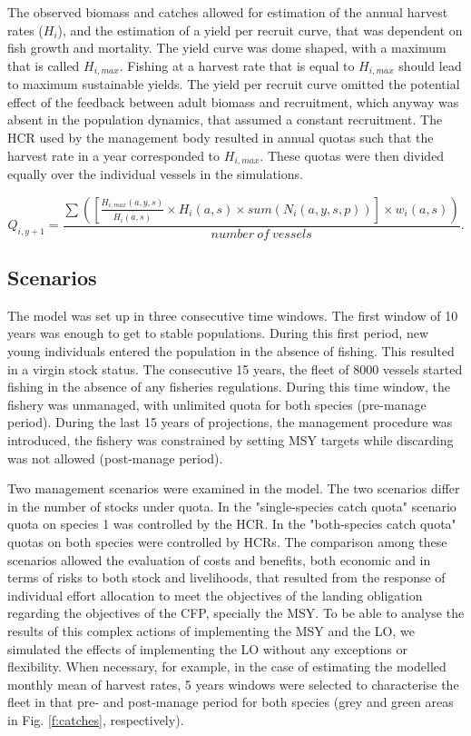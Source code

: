 \documentclass[12pt,oneline,a4paper,numbib]{ouparticle}
\numberwithin{equation}{subsection} %
\begin{document}
The observed biomass and catches allowed for estimation of the annual harvest rates ($H_i$), and the estimation of a yield per recruit curve, that was dependent on fish growth and mortality. The yield curve was dome shaped, with a maximum that is called $H_{i,max}$. Fishing at a harvest rate that is equal to $H_{i,max}$ should lead to maximum sustainable yields. The yield per recruit curve omitted the potential effect of the feedback between adult biomass and recruitment, which anyway was absent in the population dynamics, that assumed a constant recruitment. The HCR used by the management body resulted in annual quotas such that the harvest rate in a year corresponded to $H_{i,max}$. These quotas were then divided equally over the individual vessels in the simulations.

\begin{equation}
 Q_{i,y+1} = \frac
                {\sum( [\frac{H_{i,max}(a,y,s)}{\bar{H_i(a,s)}} \times H_i(a,s) \times sum( N_i (a, y, s, p))] \times w_i(a,s)) }
                {number\  of\  vessels}.
\end{equation}


\subsection{Scenarios}

The model was set up in three consecutive time windows. The first window of 10 years was enough to get to stable populations. During this first period, new young individuals entered the population in the absence of fishing. This resulted in a virgin stock status. The consecutive 15 years, the fleet of 8000 vessels started fishing in the absence of any fisheries regulations. During this time window, the fishery was unmanaged, with unlimited quota for both species (pre-manage period). During the last 15 years of projections, the management procedure was introduced, the fishery was constrained by setting MSY targets while discarding was not allowed (post-manage period). 

Two management scenarios were examined in the model. The two scenarios differ in the number of stocks under quota. In the "single-species catch quota" scenario quota on species 1 was controlled by the HCR. In the "both-species catch quota"  quotas on both species were controlled by HCRs. The comparison among these scenarios allowed the evaluation of costs and benefits, both economic and in terms of risks to both stock and livelihoods, that resulted from the response of individual effort allocation to meet the objectives of the landing obligation regarding the objectives of the CFP, specially the MSY. To be able to analyse the results of this complex actions of implementing the MSY and the LO, we simulated the effects of implementing the LO without any exceptions or flexibility. When necessary, for example, in the case of estimating the modelled monthly mean of harvest rates, 5 years windows were selected to characterise the fleet in that pre- and post-manage period for both species (grey and green areas in Fig. \ref{f:catches}, respectively).
 
\end{document}
